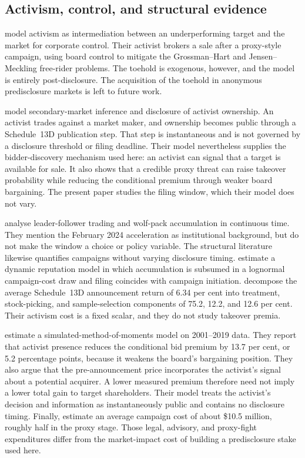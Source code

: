 \subsection{Activism, control, and structural evidence}
\label{sec:lit-activism-theory}

\textcite{burkartlee2022} model activism as intermediation between an
underperforming target and the market for corporate control. Their activist
brokers a sale after a proxy-style campaign, using board control to mitigate the
Grossman--Hart and Jensen--Meckling free-rider problems. The toehold is
exogenous, however, and the model is entirely post-disclosure. The acquisition
of the toehold in anonymous predisclosure markets is left to future work.

\textcite{corumlevit2019} model secondary-market inference and disclosure of
activist ownership. An activist trades against a \textcite{kyle1985} market maker,
and ownership becomes public through a Schedule~13D publication step. That step
is instantaneous and is not governed by a disclosure threshold or filing
deadline. Their model nevertheless supplies the bidder-discovery mechanism used
here: an activist can signal that a target is available for sale. It also shows
that a credible proxy threat can raise takeover probability while reducing the
conditional premium through weaker board bargaining. The present paper studies
the filing window, which their model does not vary.

\textcite{cetemen2026} analyse leader-follower trading and wolf-pack
accumulation in continuous time. They mention the February 2024 acceleration as
institutional background, but do not make the window a choice or policy
variable. The structural literature likewise quantifies campaigns without
varying disclosure timing. \textcite{johnsonswem2021} estimate a dynamic
reputation model in which accumulation is subsumed in a lognormal campaign-cost
draw and filing coincides with campaign initiation. \textcite{albuquerquefosschroth2022}
decompose the average Schedule~13D announcement return of 6.34 per cent into
treatment, stock-picking, and sample-selection components of 75.2, 12.2, and
12.6 per cent. Their activism cost is a fixed scalar, and they do not study
takeover premia.

\textcite{celentanolevine2025} estimate a simulated-method-of-moments model on
2001--2019 data. They report that activist presence reduces the conditional bid
premium by 13.7 per cent, or 5.2 percentage points, because it weakens the
board's bargaining position. They also argue that the pre-announcement price
incorporates the activist's signal about a potential acquirer. A lower measured
premium therefore need not imply a lower total gain to target shareholders.
Their model treats the activist's decision and information as instantaneously
public and contains no disclosure timing. Finally, \textcite{gantchev2013}
estimate an average campaign cost of about \$10.5 million, roughly half in the
proxy stage. Those legal, advisory, and proxy-fight expenditures differ from
the market-impact cost of building a predisclosure stake used here.

